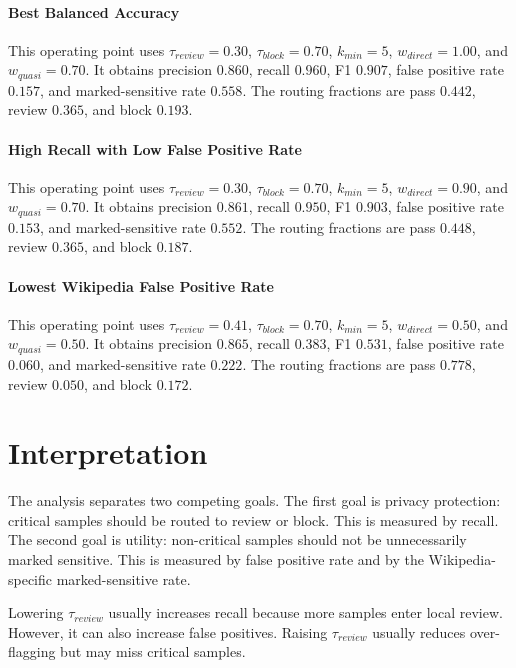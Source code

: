 \documentclass[11pt]{article}
\begin{document}
\paragraph{Best Balanced Accuracy}
This operating point uses
$\tau_{review}=0.30$,
$\tau_{block}=0.70$,
$k_{min}=5$,
$w_{direct}=1.00$, and
$w_{quasi}=0.70$.
It obtains precision $0.860$, recall $0.960$,
F1 $0.907$, false positive rate $0.157$,
and marked-sensitive rate $0.558$.
The routing fractions are pass $0.442$,
review $0.365$, and block $0.193$.



\paragraph{High Recall with Low False Positive Rate}
This operating point uses
$\tau_{review}=0.30$,
$\tau_{block}=0.70$,
$k_{min}=5$,
$w_{direct}=0.90$, and
$w_{quasi}=0.70$.
It obtains precision $0.861$, recall $0.950$,
F1 $0.903$, false positive rate $0.153$,
and marked-sensitive rate $0.552$.
The routing fractions are pass $0.448$,
review $0.365$, and block $0.187$.



\paragraph{Lowest Wikipedia False Positive Rate}
This operating point uses
$\tau_{review}=0.41$,
$\tau_{block}=0.70$,
$k_{min}=5$,
$w_{direct}=0.50$, and
$w_{quasi}=0.50$.
It obtains precision $0.865$, recall $0.383$,
F1 $0.531$, false positive rate $0.060$,
and marked-sensitive rate $0.222$.
The routing fractions are pass $0.778$,
review $0.050$, and block $0.172$.


\section{Interpretation}

The analysis separates two competing goals. The first goal is privacy protection:
critical samples should be routed to review or block. This is measured by recall.
The second goal is utility: non-critical samples should not be unnecessarily
marked sensitive. This is measured by false positive rate and by the
Wikipedia-specific marked-sensitive rate.

Lowering $\tau_{review}$ usually increases recall because more samples enter
local review. However, it can also increase false positives. Raising
$\tau_{review}$ usually reduces over-flagging but may miss critical samples.
\end{document}
